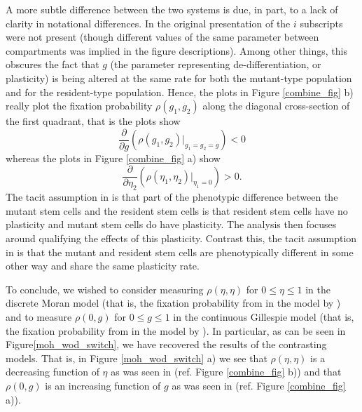 \documentclass[12pt]{article}
\begin{document}
A more subtle difference between the two systems is due, in part, to a lack of clarity in notational differences. In the original presentation of \cite{wodarz} the $i$ subscripts were not present (though different values of the same parameter between compartments was implied in the figure descriptions). Among other things, this obscures the fact that $g$ (the parameter representing de-differentiation, or plasticity) is being altered at the same rate for both the mutant-type population and for the resident-type population. Hence, the plots in Figure \ref{combine_fig} b) really plot the fixation probability $\rho(g_1,g_2)$ along the diagonal cross-section of the first quadrant, that is the plots show
\[
\frac{\partial}{\partial g}\left(\rho(g_1,g_2)\big|_{g_1=g_2=g}\right)<0
\]
whereas the plots in Figure \ref{combine_fig} a) show
\[
\frac{\partial}{\partial \eta_2}\left(\rho(\eta_1,\eta_2)\big|_{\eta_1=0}\right)>0.
\]
The tacit assumption in \cite{mohammad} is that part of the phenotypic difference between the mutant stem cells and the resident stem cells is that resident stem cells have no plasticity and mutant stem cells do have plasticity. The analysis then focuses around qualifying the effects of this plasticity. Contrast this, the tacit assumption in \cite{wodarz} is that the mutant and resident stem cells are phenotypically different in some other way and share the same plasticity rate.

To conclude, we wished to consider measuring $\rho(\eta, \eta)$ for $0\le\eta\le 1$ in the discrete Moran model (that is, the fixation probability from \cite{wodarz} in the model by \cite{mohammad}) and to measure $\rho(0, g)$ for $0\le g\le 1$ in the continuous Gillespie model (that is, the fixation probability from \cite{mohammad} in the model by \cite{wodarz}). In particular, as can be seen in Figure\ref{moh_wod_switch}, we have recovered the results of the contrasting models. That is, in Figure \ref{moh_wod_switch} a) we see that $\rho(\eta, \eta)$ is a decreasing function of $\eta$ as was seen in \cite{wodarz} (ref. Figure \ref{combine_fig} b)) and that $\rho(0,g)$ is an increasing function of $g$ as was seen in \cite{mohammad} (ref. Figure \ref{combine_fig} a)).
\end{document}
